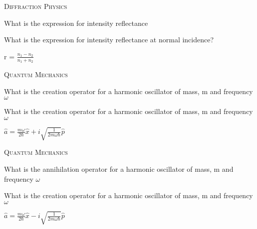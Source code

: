 \documentclass{article}
\newenvironment{flashcard}[2][]
  {\noindent\textsc{\Large#1}\par\vfill
   {\centering\Large#2\par}
   \vfill
   \newpage\Large\centering
  }
  {\newpage}
\begin{document}

\begin{flashcard}[Diffraction Physics]{What is the expression for intensity reflectance}
What is the expression for intensity reflectance at normal incidence?


r = $\frac{n_1-n_2}{n_1+n_2}$

\end{flashcard}



\begin{flashcard}[Quantum Mechanics]{What is the creation operator for a harmonic oscillator of mass, m and frequency $\omega$}
What is the creation operator for a harmonic oscillator of mass, m and frequency $\omega$

$\hat{a}=\frac{m\omega}{2\hbar}\hat{x}+i\sqrt{\frac{1}{2m\omega\hbar}}\hat{p}$


\end{flashcard}



\begin{flashcard}[Quantum Mechanics]{What is the annihilation operator for a harmonic oscillator of mass, m and frequency $\omega$}
What is the creation operator for a harmonic oscillator of mass, m and frequency $\omega$

$\hat{a}=\frac{m\omega}{2\hbar}\hat{x}-i\sqrt{\frac{1}{2m\omega\hbar}}\hat{p}$


\end{flashcard}
\end{document}
